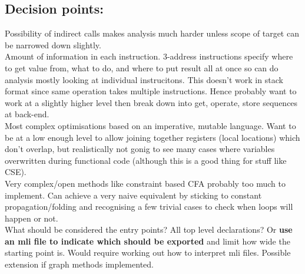 \documentclass[10pt,twoside,a4paper]{article}
\begin{document}
\subsection*{Decision points: }
Possibility of indirect calls makes analysis much harder unless scope of target can be narrowed down slightly. \\

Amount of information in each instruction. 3-address instructions specify where to get value from, what to do, and where to put result all at once so can do analysis mostly looking at individual instrucitons. This doesn't work in stack format since same operation takes multiple instructions. Hence probably want to work at a slightly higher level then break down into get, operate, store sequences at back-end.\\

Most complex optimisations based on an imperative, mutable language. Want to be at a low enough level to allow joining together registers (local locations) which don't overlap, but realistically not gonig to see many cases where variables overwritten during functional code (although this is a good thing for stuff like CSE).\\

Very complex/open methods like constraint based CFA probably too much to implement. Can achieve a very naive equivalent by sticking to constant propagation/folding and recognising a few trivial cases to check when loops will happen or not. \\

What should be considered the entry points? All top level declarations? Or \textbf{use an mli file to indicate which should be exported} and limit how wide the starting point is. Would require working out how to interpret mli files. Possible extension if graph methods implemented.
\end{document}
